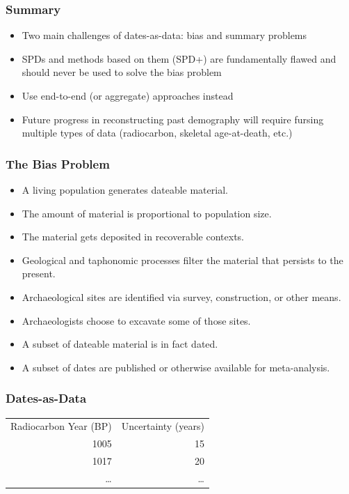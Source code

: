 \documentclass{beamer}
\begin{document}
\begin{frame}[t]
  \frametitle{Summary}
  \begin{itemize}
    \item Two main challenges of dates-as-data: bias and summary problems
    \pause
    \item SPDs and methods based on them (SPD+) are fundamentally flawed and should never be used to solve the bias problem
    \pause
    \item Use end-to-end (or aggregate) approaches instead
    \pause
    \item Future progress in reconstructing past demography will require fursing multiple types of data (radiocarbon, skeletal age-at-death, etc.)
  \end{itemize}
\end{frame}

\begin{frame}[t]
  \frametitle{The Bias Problem}
  \pause
  \begin{itemize}
    \item A living population generates dateable material.
    \pause
    \item The amount of material is proportional to population size.
    \pause
    \item The material gets deposited in recoverable contexts.
    \item Geological and taphonomic processes filter the material that persists to the present.
    \item Archaeological sites are identified via survey, construction, or other means.
    \item Archaeologists choose to excavate some of those sites.
    \item A subset of dateable material is in fact dated.
    \item A subset of dates are published or otherwise available for meta-analysis.
  \end{itemize}
\end{frame}

\begin{frame}[t]
  \frametitle{Dates-as-Data}
\begin{center}
	\begin{tabular}{ r r }
		Radiocarbon Year (BP) & Uncertainty (years)\\
		1005 & 15\\
		1017 & 20\\
		\ldots & \ldots\\
	\end{tabular}
\end{center}
\end{frame}
\end{document}
